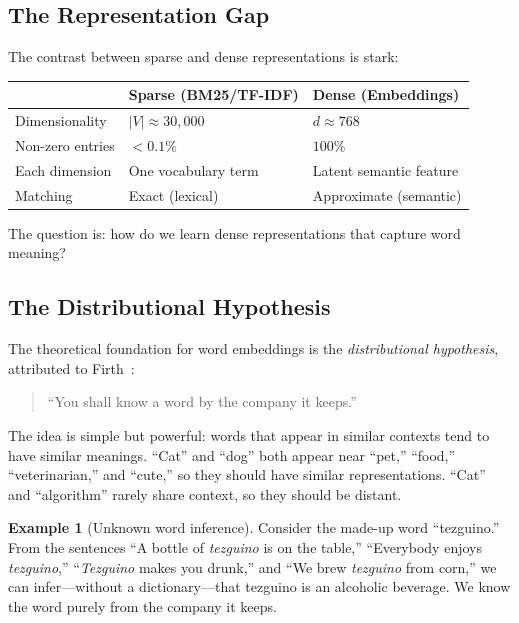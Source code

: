 \documentclass[11pt,a4paper]{article}
\theoremstyle{definition}
\newtheorem{example}{Example}[section]
\theoremstyle{plain}
\begin{document}
\subsection{The Representation Gap}

The contrast between sparse and dense representations is stark:

\begin{center}
\begin{tabular}{lll}
\toprule
& \textbf{Sparse (BM25/TF-IDF)} & \textbf{Dense (Embeddings)} \\
\midrule
Dimensionality & $|V| \approx 30{,}000$ & $d \approx 768$ \\
Non-zero entries & $< 0.1\%$ & $100\%$ \\
Each dimension & One vocabulary term & Latent semantic feature \\
Matching & Exact (lexical) & Approximate (semantic) \\
\bottomrule
\end{tabular}
\end{center}

The question is: how do we learn dense representations that capture word meaning?

\subsection{The Distributional Hypothesis}

The theoretical foundation for word embeddings is the \emph{distributional hypothesis}, attributed to Firth~\cite{firth1957synopsis}:

\begin{quote}
``You shall know a word by the company it keeps.''
\end{quote}

The idea is simple but powerful: words that appear in similar contexts tend to have similar meanings. ``Cat'' and ``dog'' both appear near ``pet,'' ``food,'' ``veterinarian,'' and ``cute,'' so they should have similar representations. ``Cat'' and ``algorithm'' rarely share context, so they should be distant.

\begin{example}[Unknown word inference]
Consider the made-up word ``tezguino.'' From the sentences ``A bottle of \emph{tezguino} is on the table,'' ``Everybody enjoys \emph{tezguino},'' ``\emph{Tezguino} makes you drunk,'' and ``We brew \emph{tezguino} from corn,'' we can infer---without a dictionary---that tezguino is an alcoholic beverage. We know the word purely from the company it keeps.
\end{example}
\end{document}
